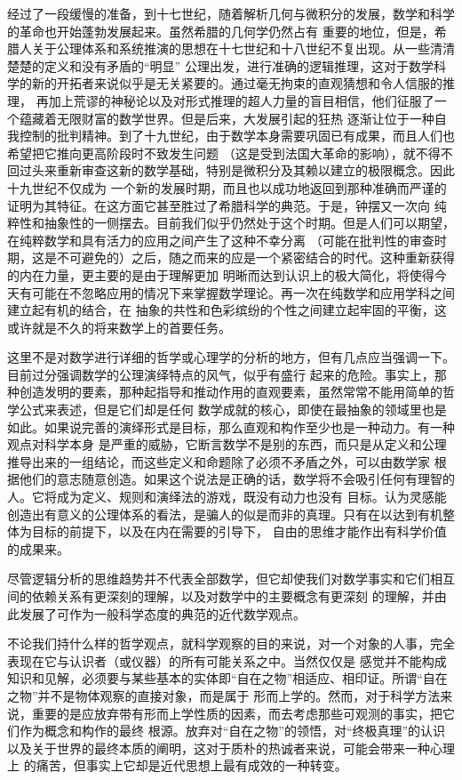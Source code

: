 经过了一段缓慢的准备，到十七世纪，随着解析几何与微积分的发展，数学和科学的革命也开始蓬勃发展起来。虽然希腊的几何学仍然占有
重要的地位，但是，希腊人关于公理体系和系统推演的思想在十七世纪和十八世纪不复出现。从一些清清楚楚的定义和没有矛盾的“明显”
公理出发，进行准确的逻辑推理，这对于数学科学的新的开拓者来说似乎是无关紧要的。通过毫无拘束的直观猜想和令人信服的推理，
再加上荒谬的神秘论以及对形式推理的超人力量的盲目相信，他们征服了一个蕴藏着无限财富的数学世界。但是后来，大发展引起的狂热
逐渐让位于一种自我控制的批判精神。到了十九世纪，由于数学本身需要巩固已有成果，而且人们也希望把它推向更高阶段时不致发生问题
（这是受到法国大革命的影响），就不得不回过头来重新审查这新的数学基础，特别是微积分及其赖以建立的极限概念。因此十九世纪不仅成为
一个新的发展时期，而且也以成功地返回到那种准确而严谨的证明为其特征。在这方面它甚至胜过了希腊科学的典范。于是，钟摆又一次向
纯粹性和抽象性的一侧摆去。目前我们似乎仍然处于这个时期。但是人们可以期望，在纯粹数学和具有活力的应用之间产生了这种不幸分离
（可能在批判性的审查时期，这是不可避免的）之后，随之而来的应是一个紧密结合的时代。这种重新获得的内在力量，更主要的是由于理解更加
明晰而达到认识上的极大简化，将使得今天有可能在不忽略应用的情况下来掌握数学理论。再一次在纯数学和应用学科之间建立起有机的结合，在
抽象的共性和色彩缤纷的个性之间建立起牢固的平衡，这或许就是不久的将来数学上的首要任务。

这里不是对数学进行详细的哲学或心理学的分析的地方，但有几点应当强调一下。目前过分强调数学的公理演绎特点的风气，似乎有盛行
起来的危险。事实上，那种创造发明的要素，那种起指导和推动作用的直观要素，虽然常常不能用简单的哲学公式来表述，但是它们却是任何
数学成就的核心，即使在最抽象的领域里也是如此。如果说完善的演绎形式是目标，那么直观和构作至少也是一种动力。有一种观点对科学本身
是严重的威胁，它断言数学不是别的东西，而只是从定义和公理推导出来的一组结论，而这些定义和命题除了必须不矛盾之外，可以由数学家
根据他们的意志随意创造。如果这个说法是正确的话，数学将不会吸引任何有理智的人。它将成为定义、规则和演绎法的游戏，既没有动力也没有
目标。认为灵感能创造出有意义的公理体系的看法，是骗人的似是而非的真理。只有在以达到有机整体为目标的前提下，以及在内在需要的引导下，
自由的思维才能作出有科学价值的成果来。

尽管逻辑分析的思维趋势并不代表全部数学，但它却使我们对数学事实和它们相互间的依赖关系有更深刻的理解，以及对数学中的主要概念有更深刻
的理解，并由此发展了可作为一般科学态度的典范的近代数学观点。

不论我们持什么样的哲学观点，就科学观察的目的来说，对一个对象的人事，完全表现在它与认识者（或仪器）的所有可能关系之中。当然仅仅是
感觉并不能构成知识和见解，必须要与某些基本的实体即“自在之物”相适应、相印证。所谓“自在之物”并不是物体观察的直接对象，而是属于
形而上学的。然而，对于科学方法来说，重要的是应放弃带有形而上学性质的因素，而去考虑那些可观测的事实，把它们作为概念和构作的最终
根源。放弃对“自在之物”的领悟，对“终极真理”的认识以及关于世界的最终本质的阐明，这对于质朴的热诚者来说，可能会带来一种心理上
的痛苦，但事实上它却是近代思想上最有成效的一种转变。

